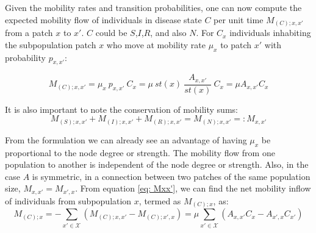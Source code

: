 Given the mobility rates and transition probabilities, one can now compute the expected mobility flow of individuals in disease state $C$ per unit time $M_{(C);x,x'}$ from a patch $x$ to $x'$. $C$ could be $S$,$I$,$R$, and also $N$. For $C_x$ individuals inhabiting the subpopulation patch $x$ who move at mobility rate $\mu_x$ to patch $x'$ with probability $p_{x,x'}$:

\begin{equation}
    M_{(C);x,x'} = \mu_x\ p_{x,x'} \ C_{x} = \mu \  st(x) \ \frac{A_{x,x'}}{st(x)} \ C_{x} = \mu  A_{x,x'} C_{x}
    \label{eq: Mxx'}
\end{equation}

It is also important to note the conservation of mobility sums:
\begin{equation}
    M_{(S);x,x'} + M_{(I);x,x'} + M_{(R);x,x'} = M_{(N);x,x'} =:M_{x,x'}
\end{equation}

From the formulation we can already see an advantage of having $\mu_x$ be proportional to the node degree or strength. The mobility flow from one population to another is independent of the node degree or strength. Also, in the case $A$ is symmetric, in a connection between two patches of the same population size, $M_{x,x'}=M_{x',x}$. 
From equation \ref{eq: Mxx'}, we can find the net mobility inflow of individuals from subpopulation $x$, termed as $M_{(C);x}$, as:
\begin{equation}
    M_{(C);x} = -\sum_{x' \in \mathcal{X}} (M_{(C);x,x'} - M_{(C);x',x}) = \mu \sum_{x' \in \mathcal{X}} (A_{x,x'} C_{x} -  A_{x',x} C_{x'}) 
    \label{eq: Mx}
\end{equation}

